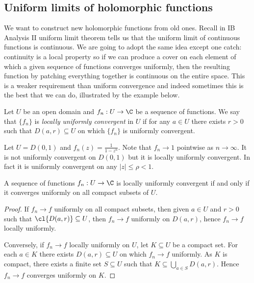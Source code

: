 \documentclass[a4paper]{article}
\begin{document}
\subsection{Uniform limits of holomorphic functions}

We want to construct new holomorphic functions from old ones. Recall in IB Analysis II uniform limit theorem tells us that the uniform limit of continuous functions is continuous. We are going to adopt the same idea except one catch: continuity is a local property so if we can produce a cover on each element of which a given sequence of functions converges uniformly, then the resulting function by patching everything together is continuous on the entire space. This is a weaker requirement than uniform convergence and indeed sometimes this is the best that we can do, illustrated by the example below.

\begin{definition}
  Let \(U\) be an open domain and \(f_n: U \to \C\) be a sequence of functions. We say that \(\{f_n\}\) is \emph{locally uniformly convergent} in \(U\) if for any \(a \in U\) there exists \(r > 0\) such that \(D(a, r) \subseteq U\) on which \(\{f_n\}\) is uniformly convergent.
\end{definition}

\begin{eg}
  Let \(U = D(0, 1)\) and \(f_n(z) = \frac{1}{1 - z^n}\). Note that \(f_n \to 1\) pointwise as \(n \to \infty\). It is not uniformly convergent on \(D(0, 1)\) but it is locally uniformly convergent. In fact it is uniformly convergent on any \(|z| \leq \rho < 1\).
\end{eg}

\begin{proposition}
  A sequence of functions \(f_n: U \to \C\) is locally uniformly convergent if and only if it converges uniformly on all compact subsets of \(U\).
\end{proposition}

\begin{proof}
  If \(f_n \to f\) uniformly on all compact subsets, then given \(a \in U\) and \(r > 0\) such that \(\cl{D(a, r)} \subseteq U\), then \(f_n \to f\) uniformly on \(D(a, r)\), hence \(f_n \to f\) locally uniformly.

  Conversely, if \(f_n \to f\) locally uniformly on \(U\), let \(K \subseteq U\) be a compact set. For each \(a \in K\) there exists \(D(a, r) \subseteq U\) on which \(f_n \to f\) uniformly. As \(K\) is compact, there exists a finite set \(S \subseteq U\) such that \(K \subseteq \bigcup_{a \in S} D(a, r)\). Hence \(f_n \to f\) converges uniformly on \(K\).
\end{proof}
\end{document}
